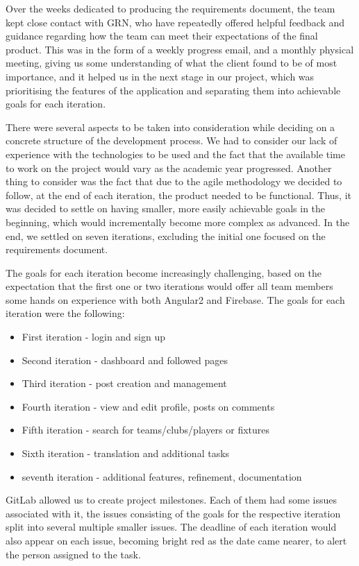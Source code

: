 \documentclass{l3proj}
\begin{document}
Over the weeks dedicated to producing the requirements document, the team
 kept close contact with GRN, who have repeatedly offered helpful feedback
 and guidance regarding how the team can meet their expectations of the
 final product. This was in the form of a weekly progress email, and a monthly
 physical meeting, giving us some understanding of what the client found
 to be of most importance, and it helped us in the next stage in our
 project, which was prioritising the features of the application and separating
 them into achievable goals for each iteration.

There were several aspects to be taken into consideration while deciding
 on a concrete structure of the development process. We had to consider
 our lack of experience with the technologies to be used and the fact
 that the available time to work on the project would vary as the academic
 year progressed. Another thing to consider was the fact that due to the
 agile methodology we decided to follow, at the end of each iteration, the
 product needed to be functional. Thus, it was decided to settle on having
 smaller, more easily achievable goals in the beginning, which would
 incrementally become more complex as advanced. In the end, we settled
 on seven iterations, excluding the initial one focused on the requirements
 document.

The goals for each iteration become increasingly challenging, based on the
 expectation that the first one or two iterations would offer all team
 members some hands on experience with both Angular2 and Firebase. The
 goals for each iteration were the following:
\begin{itemize}
\item First iteration - login and sign up
\item Second iteration - dashboard and followed pages
\item Third iteration - post creation and management
\item Fourth iteration - view and edit profile, posts on comments
\item Fifth iteration - search for teams/clubs/players or fixtures
\item Sixth iteration - translation and additional tasks
\item seventh iteration - additional features, refinement, documentation
\end{itemize}



GitLab allowed us to create project milestones. Each of them had some
 issues associated with it, the issues consisting of the goals for the
 respective iteration split into several multiple smaller issues. The deadline
 of each iteration would also appear on each issue, becoming bright red as the
 date came nearer, to alert the person assigned to the task.
\end{document}
